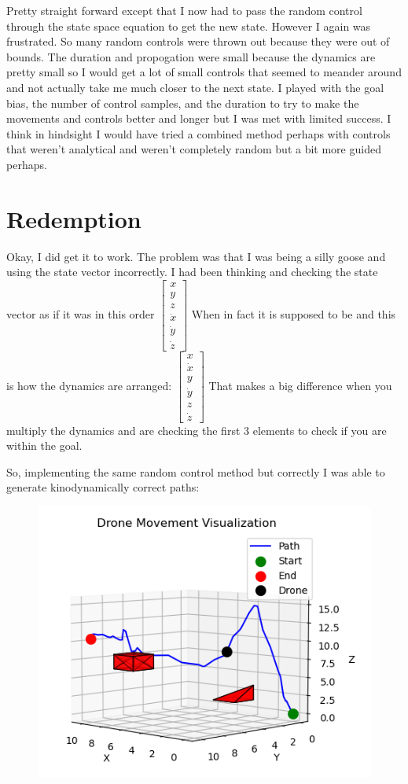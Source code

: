 \documentclass{article}
\begin{document}
Pretty straight forward except that I now had to pass the random control through the state space equation to get the new state.
However I again was frustrated.
So many random controls were thrown out because they were out of bounds.
The duration and propogation were small because the dynamics are pretty small so I would get a lot of small controls that seemed to meander around and not actually take me much closer to the next state.
I played with the goal bias, the number of control samples, and the duration to try to make the movements and controls better and longer but I was met with limited success.
I think in hindsight I would have tried a combined method perhaps with controls that weren't analytical and weren't completely random but a bit more guided perhaps.

\section*{Redemption}

Okay, I did get it to work. The problem was that I was being a silly goose and using the state vector incorrectly.
I had been thinking and checking the state vector as if it was in this order $\begin{bmatrix}
    x \\
    y \\
    z \\
    \dot{x} \\
    \dot{y} \\
    \dot{z} 
\end{bmatrix}$
When in fact it is supposed to be and this is how the dynamics are arranged:
$\begin{bmatrix}
    x \\
    \dot{x} \\
    y \\
    \dot{y} \\
    z \\
    \dot{z} 
\end{bmatrix}$
That makes a big difference when you multiply the dynamics and are checking the first 3 elements to check if you are within the goal.

So, implementing the same random control method but correctly I was able to generate kinodynamically correct paths:

\begin{figure}[H]
    \centering
    \includegraphics[width=0.7\linewidth]{fullDynamicPath.png}
\end{figure}
\end{document}
